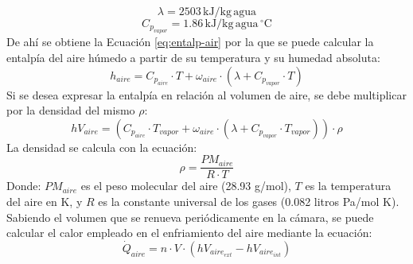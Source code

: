  \begin{equation}
 	\lambda = 2503 \, \text{kJ/kg} \, \text{agua}
 \end{equation}
 \begin{equation}
 	C_{p_{vapor}} = 1.86 \, \text{kJ/kg} \, \text{agua}\, ^\circ \text{C} 
 \end{equation}
 De ahí se obtiene la Ecuación \ref{eq:entalp-air} por la que se puede calcular la entalpía del aire húmedo a partir de su temperatura y su humedad absoluta:
 \begin{equation}
 	h_{aire} = C_{p_{aire}} \cdot T + \omega_{aire} \cdot (\lambda + C_{p_{vapor}} \cdot T)
 \end{equation}
 Si se desea expresar la entalpía en relación al volumen de aire, se debe multiplicar por la densidad del mismo \( \rho \):
 \begin{equation}
 	hV_{aire} = (C_{p_{aire}} \cdot T_{vapor} + \omega_{aire} \cdot (\lambda + C_{p_{vapor}} \cdot T_{vapor})) \cdot \rho
 \end{equation}
 La densidad se  calcula con la ecuación:
 \begin{equation}
 	\rho = \frac{PM_{aire}}{R \cdot T}
 \end{equation}
 Donde: \( PM_{aire} \) es el peso molecular del aire (28.93 g/mol), \( T \) es la temperatura del aire en K, y \( R \) es la constante universal de los gases (0.082 litros Pa/mol K).\\
 Sabiendo el volumen que se renueva periódicamente en la cámara, se puede calcular el calor empleado en el enfriamiento del aire mediante la ecuación:
 \begin{equation}
 	\dot{Q}_{aire} = n \cdot V \cdot (hV_{aire_{ext}} - hV_{aire_{int}})
 \end{equation}

